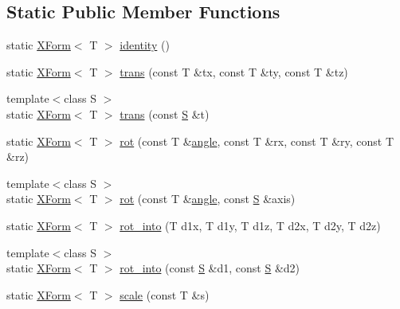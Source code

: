 \subsection*{Static Public Member Functions}
\begin{DoxyCompactItemize}
\item 
static \hyperlink{classtrimesh_1_1XForm}{X\+Form}$<$ T $>$ \hyperlink{classtrimesh_1_1XForm_a48c04ec2a96aa40027ca977191c0e167}{identity} ()
\item 
static \hyperlink{classtrimesh_1_1XForm}{X\+Form}$<$ T $>$ \hyperlink{classtrimesh_1_1XForm_a7806925df0b74af227489baf4fc4427f}{trans} (const T \&tx, const T \&ty, const T \&tz)
\item 
{\footnotesize template$<$class S $>$ }\\static \hyperlink{classtrimesh_1_1XForm}{X\+Form}$<$ T $>$ \hyperlink{classtrimesh_1_1XForm_af3e8fe8bed27a77abf4f1587631ae8e5}{trans} (const \hyperlink{ego_8cc_abde73cd36321648268fb4543509b996a}{S} \&t)
\item 
static \hyperlink{classtrimesh_1_1XForm}{X\+Form}$<$ T $>$ \hyperlink{classtrimesh_1_1XForm_a522678b276348f5bf91553a1e5f88972}{rot} (const T \&\hyperlink{namespacetrimesh_acba06a73033388814bcced624f9bf561}{angle}, const T \&rx, const T \&ry, const T \&rz)
\item 
{\footnotesize template$<$class S $>$ }\\static \hyperlink{classtrimesh_1_1XForm}{X\+Form}$<$ T $>$ \hyperlink{classtrimesh_1_1XForm_a5980fc1b56390c0b23f3ffb966c4e54e}{rot} (const T \&\hyperlink{namespacetrimesh_acba06a73033388814bcced624f9bf561}{angle}, const \hyperlink{ego_8cc_abde73cd36321648268fb4543509b996a}{S} \&axis)
\item 
static \hyperlink{classtrimesh_1_1XForm}{X\+Form}$<$ T $>$ \hyperlink{classtrimesh_1_1XForm_adacede8698b599dd1d2f65af91754fb4}{rot\+\_\+into} (T d1x, T d1y, T d1z, T d2x, T d2y, T d2z)
\item 
{\footnotesize template$<$class S $>$ }\\static \hyperlink{classtrimesh_1_1XForm}{X\+Form}$<$ T $>$ \hyperlink{classtrimesh_1_1XForm_a5d47aa49e7b78517fbef529f8909c62b}{rot\+\_\+into} (const \hyperlink{ego_8cc_abde73cd36321648268fb4543509b996a}{S} \&d1, const \hyperlink{ego_8cc_abde73cd36321648268fb4543509b996a}{S} \&d2)
\item 
static \hyperlink{classtrimesh_1_1XForm}{X\+Form}$<$ T $>$ \hyperlink{classtrimesh_1_1XForm_aff2e6e97418fad4b72ed1991a1f4db65}{scale} (const T \&s)
\item 

\end{DoxyCompactItemize}
